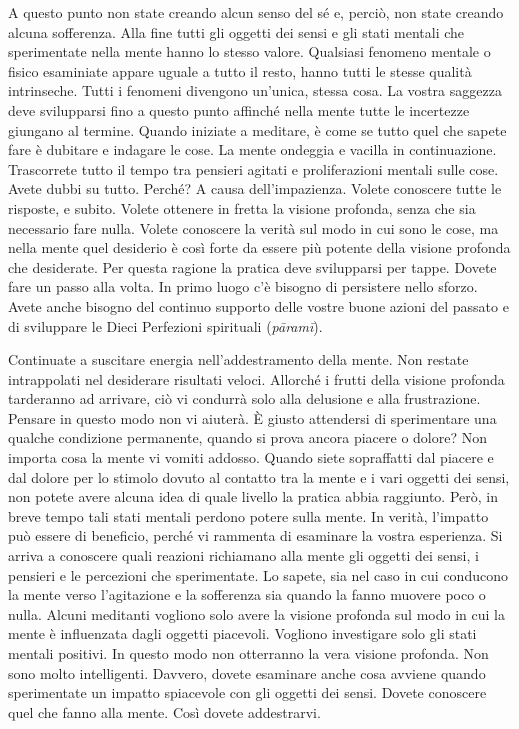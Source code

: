 A questo punto non state creando alcun senso del sé e, perciò, non state
creando alcuna sofferenza. Alla fine tutti gli oggetti dei sensi e gli
stati mentali che sperimentate nella mente hanno lo stesso valore.
Qualsiasi fenomeno mentale o fisico esaminiate appare uguale a tutto il
resto, hanno tutti le stesse qualità intrinseche. Tutti i fenomeni
divengono un'unica, stessa cosa. La vostra saggezza deve svilupparsi
fino a questo punto affinché nella mente tutte le incertezze giungano al
termine. Quando iniziate a meditare, è come se tutto quel che sapete
fare è dubitare e indagare le cose. La mente ondeggia e vacilla in
continuazione. Trascorrete tutto il tempo tra pensieri agitati e
proliferazioni mentali sulle cose. Avete dubbi su tutto. Perché? A causa
dell'impazienza. Volete conoscere tutte le risposte, e subito. Volete
ottenere in fretta la visione profonda, senza che sia necessario fare
nulla. Volete conoscere la verità sul modo in cui sono le cose, ma nella
mente quel desiderio è così forte da essere più potente della visione
profonda che desiderate. Per questa ragione la pratica deve svilupparsi
per tappe. Dovete fare un passo alla volta. In primo luogo c'è bisogno
di persistere nello sforzo. Avete anche bisogno del continuo supporto
delle vostre buone azioni del passato e di sviluppare le Dieci
Perfezioni spirituali (\emph{pāramī}).

Continuate a suscitare energia nell'addestramento della mente. Non
restate intrappolati nel desiderare risultati veloci. Allorché i frutti
della visione profonda tarderanno ad arrivare, ciò vi condurrà solo alla
delusione e alla frustrazione. Pensare in questo modo non vi aiuterà. È
giusto attendersi di sperimentare una qualche condizione permanente,
quando si prova ancora piacere o dolore? Non importa cosa la mente vi
vomiti addosso. Quando siete sopraffatti dal piacere e dal dolore per lo
stimolo dovuto al contatto tra la mente e i vari oggetti dei sensi, non
potete avere alcuna idea di quale livello la pratica abbia raggiunto.
Però, in breve tempo tali stati mentali perdono potere sulla mente. In
verità, l'impatto può essere di beneficio, perché vi rammenta di
esaminare la vostra esperienza. Si arriva a conoscere quali reazioni
richiamano alla mente gli oggetti dei sensi, i pensieri e le percezioni
che sperimentate. Lo sapete, sia nel caso in cui conducono la mente
verso l'agitazione e la sofferenza sia quando la fanno muovere poco o
nulla. Alcuni meditanti vogliono solo avere la visione profonda sul modo
in cui la mente è influenzata dagli oggetti piacevoli. Vogliono
investigare solo gli stati mentali positivi. In questo modo non
otterranno la vera visione profonda. Non sono molto intelligenti.
Davvero, dovete esaminare anche cosa avviene quando sperimentate un
impatto spiacevole con gli oggetti dei sensi. Dovete conoscere quel che
fanno alla mente. Così dovete addestrarvi.

